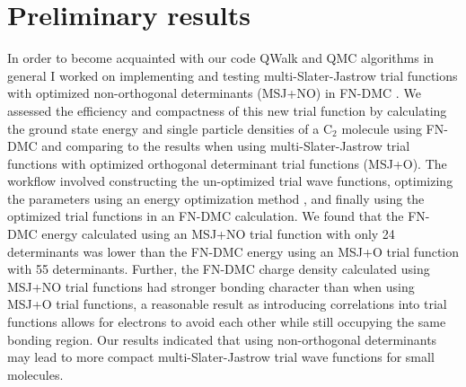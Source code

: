 \documentclass{article}
\begin{document}
\section{Preliminary results}
In order to become acquainted with our code QWalk \cite{WAGNER20093390} and QMC algorithms in general I worked on implementing and testing multi-Slater-Jastrow trial functions with optimized non-orthogonal determinants (MSJ+NO) in FN-DMC \cite{Pathak2018}.
We assessed the efficiency and compactness of this new trial function by calculating the ground state energy and single particle densities of a C$_2$ molecule using FN-DMC and comparing to the results when using multi-Slater-Jastrow trial functions with optimized orthogonal determinant trial functions (MSJ+O). 
The workflow involved constructing the un-optimized trial wave functions, optimizing the parameters using an energy optimization method \cite{Toulouse2007}, and finally using the optimized trial functions in an FN-DMC calculation. 
We found that the FN-DMC energy calculated using an MSJ+NO trial function with only 24 determinants was lower than the FN-DMC energy using an MSJ+O trial function with 55 determinants. 
Further, the FN-DMC charge density calculated using MSJ+NO trial functions had stronger bonding character than when using MSJ+O trial functions, a reasonable result as introducing correlations into trial functions allows for electrons to avoid each other while still occupying the same bonding region. 
Our results indicated that using non-orthogonal determinants may lead to more compact multi-Slater-Jastrow trial wave functions for small molecules.
\end{document}
